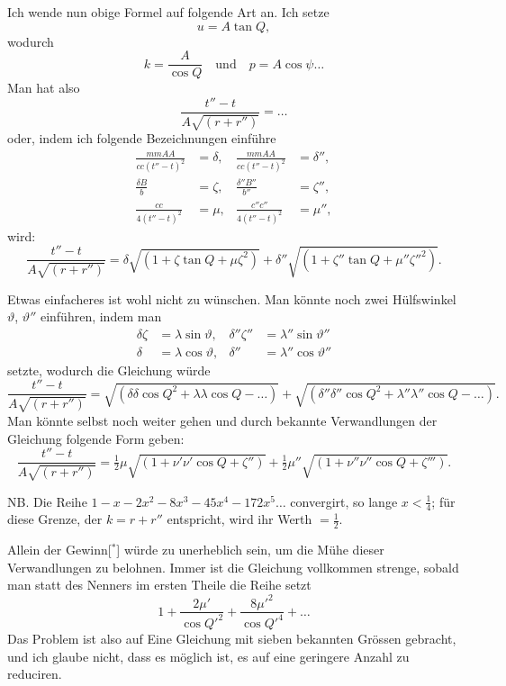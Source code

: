 \documentclass[12pt,a4paper]{article}
\begin{document}
Ich wende nun obige Formel auf folgende Art an. Ich setze
\[
u = A\tan Q,
\]
wodurch
\[
k = \frac{A}{\cos Q} \quad \text{und} \quad p = A\cos\psi \ldots
\]
Man hat also
\[
\frac{t'' - t}{A\sqrt{(r + r'')}} = \ldots
\]
oder, indem ich folgende Bezeichnungen einf\"uhre
\begin{align*}
\frac{mmAA}{cc(t'' - t)^2} &= \delta, & \frac{mmAA}{cc(t'' - t)^2} &= \delta'', \\
\frac{\delta B}{b} &= \zeta, & \frac{\delta''B''}{b''} &= \zeta'', \\
\frac{cc}{4(t'' - t)^2} &= \mu, & \frac{c''c''}{4(t'' - t)^2} &= \mu'',
\end{align*}
wird:
\[
\frac{t'' - t}{A\sqrt{(r + r'')}} = \delta\sqrt{(1 + \zeta\tan Q + \mu\zeta^2)} + \delta''\sqrt{(1 + \zeta''\tan Q + \mu''\zeta''^2)}.
\]

\newpage

Etwas einfacheres ist wohl nicht zu w\"unschen. Man k\"onnte noch zwei
H\"ulfswinkel $\vartheta$, $\vartheta''$ einf\"uhren, indem man
\begin{align*}
\delta\zeta &= \lambda\sin\vartheta, & \delta''\zeta'' &= \lambda''\sin\vartheta'' \\
\delta &= \lambda\cos\vartheta, & \delta'' &= \lambda''\cos\vartheta''
\end{align*}
setzte, wodurch die Gleichung w\"urde
\[
\frac{t'' - t}{A\sqrt{(r + r'')}} = \sqrt{(\delta\delta\cos Q^2 + \lambda\lambda\cos Q - \ldots)} + \sqrt{(\delta''\delta''\cos Q^2 + \lambda''\lambda''\cos Q - \ldots)}.
\]
Man k\"onnte selbst noch weiter gehen und durch bekannte Verwandlungen
der Gleichung folgende Form geben:
\[
\frac{t'' - t}{A\sqrt{(r + r'')}} = \tfrac{1}{2}\mu\sqrt{(1 + \nu'\nu'\cos Q + \zeta'')} + \tfrac{1}{2}\mu''\sqrt{(1 + \nu''\nu''\cos Q + \zeta''')}.
\]

\begin{flushright}
 NB. Die Reihe $1 - x - 2x^2 - 8x^3 - 45x^4 - 172x^5 \ldots$
convergirt, so lange $x < \tfrac{1}{4}$; f\"ur diese Grenze, der $k = r + r''$ entspricht, wird ihr Werth $= \tfrac{1}{2}$.
\end{flushright}

\newpage

Allein der Gewinn[$^*$] w\"urde zu unerheblich sein, um die M\"uhe dieser
Verwandlungen zu belohnen. Immer ist die Gleichung vollkommen strenge,
sobald man statt des Nenners im ersten Theile die Reihe setzt
\[
1 + \frac{2\mu'}{\cos Q'^2} + \frac{8\mu'^2}{\cos Q'^4} + \ldots
\]
Das Problem ist also auf Eine Gleichung mit sieben bekannten Gr\"ossen
gebracht, und ich glaube nicht, dass es m\"oglich ist, es auf eine geringere
Anzahl zu reduciren.
\end{document}
